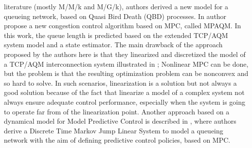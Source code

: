 literature (mostly M/M/k and M/G/k), authors derived a new model for a queueing network, based on Quasi Bird Death (QBD) processes. In \cite{WANG2012120} author propose a new congestion control algorithm based on MPC, called MPAQM. In this work, the queue length is predicted based on the extended TCP/AQM system model and a state estimator. The main drawback of the approach proposed by the authors here is that they linearized and discretized the model of a TCP/AQM interconnection system illustrated in \cite{TCPSTATESPACE}; Nonlinear MPC can be done, but the problem is that the resulting optimization problem can be nonconvex and so hard to solve. In such scenarios, linearization is a solution but not always a good solution because of the fact that linearize a model of a complex system not always ensure adequate control performance, especially when the system is going to operate far from of the linearization point. Another approach based on a dynamical model for Model Predictive Control is described in \cite{SchoffMPC}, where authors derive a Discrete Time Markov Jump Linear System to model a queueing network with the aim of defining predictive control policies, based on MPC.
